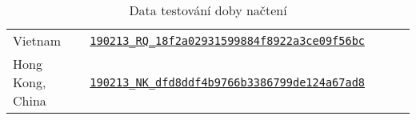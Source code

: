 \documentclass[a4paper, 12pt]{article}
\begin{document}
\begin{table}[H]
\begin{tabular}{*5l}
    Vietnam                 & \href{https://www.webpagetest.org/result/190213_RQ_18f2a02931599884f8922a3ce09f56bc}{\texttt{190213\_RQ\_18f2a02931599884f8922a3ce09f56bc}} \\
    Hong Kong, China        & \href{https://www.webpagetest.org/result/190213_NK_dfd8ddf4b9766b3386799de124a67ad8}{\texttt{190213\_NK\_dfd8ddf4b9766b3386799de124a67ad8}} \\ \bottomrule \hline
  \end{tabular}
  \label{tab:Data testování doby načtení}
  \caption{Data testování doby načtení}
\end{table}
\end{document}

